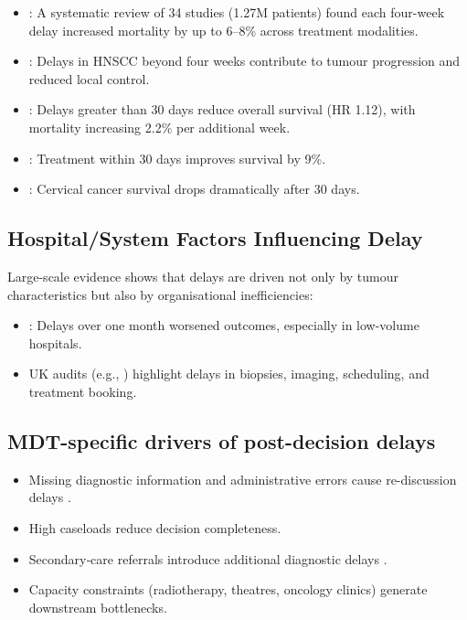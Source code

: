 \begin{itemize}
    \item \cite{hanna2020}: A systematic review of 34 studies (1.27M patients) found each four-week delay increased mortality by up to 6–8\% across treatment modalities.
    \item \cite{coca-pelaz2018}: Delays in HNSCC beyond four weeks contribute to tumour progression and reduced local control.
    \item \cite{sharma2016}: Delays greater than 30 days reduce overall survival (HR 1.12), with mortality increasing 2.2\% per additional week.
    \item \cite{villemure-poliquin2025}: Treatment within 30 days improves survival by 9\%.
    \item \cite{saleh2024}: Cervical cancer survival drops dramatically after 30 days.
\end{itemize}

\subsection{Hospital/System Factors Influencing Delay}

Large-scale evidence shows that delays are driven not only by tumour characteristics but also by organisational inefficiencies:

\begin{itemize}
    \item \cite{yun2012}: Delays over one month worsened outcomes, especially in low-volume hospitals.
    \item UK audits (e.g., \cite{lim2025}) highlight delays in biopsies, imaging, scheduling, and treatment booking.
\end{itemize}

\subsection{MDT-specific drivers of post-decision delays}

\begin{itemize}
    \item Missing diagnostic information and administrative errors cause re-discussion delays \citep{soukup2022}.
    \item High caseloads reduce decision completeness.
    \item Secondary‑care referrals introduce additional diagnostic delays \citep{chakravarty2023}.
    \item Capacity constraints (radiotherapy, theatres, oncology clinics) generate downstream bottlenecks.
\end{itemize}

